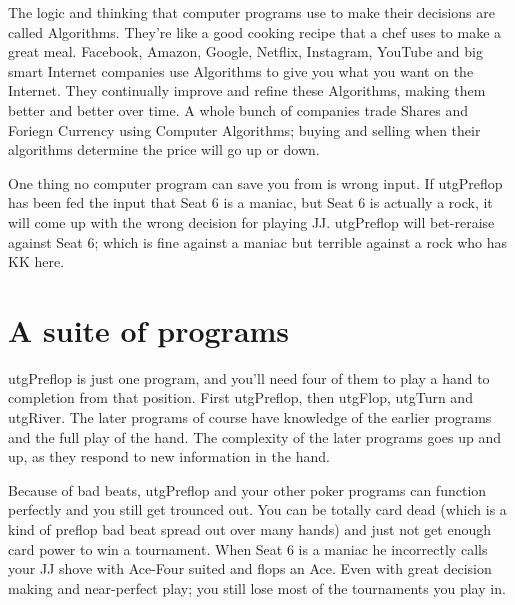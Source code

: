 The logic and thinking that computer programs use to
make their decisions are called Algorithms. They're like a good
cooking recipe that a chef uses to make a great meal. Facebook,
Amazon, Google, Netflix, Instagram, YouTube and big smart Internet
companies use Algorithms to give you what you want on the Internet.
They continually improve and refine these Algorithms, making them
better and better over time. A whole bunch of companies trade Shares
and Foriegn Currency using Computer Algorithms; buying and selling
when their algorithms determine the price will go up or down.


One thing no computer program can save you from is wrong input.
If utgPreflop has been fed the input that Seat 6 is a maniac,
but Seat 6 is actually a rock, it will come up with the wrong decision
for playing JJ. utgPreflop will bet-reraise against Seat 6; which is
fine against a maniac but terrible against a rock who has KK here.


\section*{A suite of programs}

utgPreflop is just one program, and you'll need four of them to
play a hand to completion from that position. First utgPreflop,
then utgFlop, utgTurn and utgRiver. The later programs of course
have knowledge of the earlier programs and the full play of the hand.
The complexity of the later programs goes up and up, as they respond
to new information in the hand.

Because of bad beats, utgPreflop and your other poker programs can
function perfectly and you still get trounced out. You can be totally
card dead (which is a kind of preflop bad beat spread out over many
hands) and just not get enough card power to win a
tournament. When Seat 6 is a maniac he incorrectly calls your JJ shove
with Ace-Four suited and flops an Ace. Even with great decision making
and near-perfect play; you still lose most of the tournaments you play
in.

